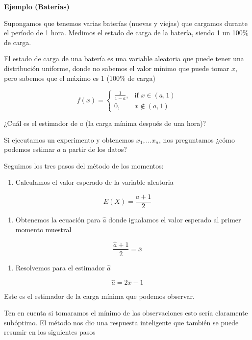 \documentclass[
]{book}
\providecommand{\tightlist}{%
  \setlength{\itemsep}{0pt}\setlength{\parskip}{0pt}}
\begin{document}
\textbf{Ejemplo (Baterías)}

Supongamos que tenemos varias baterías (nuevas y viejas) que cargamos durante el período de 1 hora. Medimos el estado de carga de la batería, siendo 1 un 100\% de carga.

El estado de carga de una batería es una variable aleatoria que puede tener una distribución uniforme, donde no sabemos el valor mínimo que puede tomar \(x\), pero sabemos que el máximo es 1 (\(100\%\) de carga)

\[
f(x)=
\begin{cases}
    \frac{1}{1-a},& \text{if } x\in (a,1)\\
    0,& x\notin (a,1)
\end{cases}
\]

¿Cuál es el estimador de \(a\) (la carga mínima después de una hora)?

Si ejecutamos un experimento y obtenemos \(x_1,...x_n\), nos preguntamos ¿cómo podemos estimar \(a\) a partir de los datos?

Seguimos los tres pasos del método de los momentos:

\begin{enumerate}
\def\labelenumi{\arabic{enumi}.}
\tightlist
\item
  Calculamos el valor esperado de la variable aleatoria
\end{enumerate}

\[E(X)=\frac{a+1}{2}\]

\begin{enumerate}
\def\labelenumi{\arabic{enumi}.}
\setcounter{enumi}{1}
\tightlist
\item
  Obtenemos la ecuación para \(\hat{a}\) donde igualamos el valor esperado al primer momento muestral
\end{enumerate}

\[\frac{\hat{a}+1}{2}=\bar{x}\]

\begin{enumerate}
\def\labelenumi{\arabic{enumi}.}
\setcounter{enumi}{2}
\tightlist
\item
  Resolvemos para el estimador \(\hat{a}\)
\end{enumerate}

\[\hat{a}=2\bar{x}-1\]

Este es el estimador de la carga mínima que podemos observar.

Ten en cuenta si tomaramos el mínimo de las observaciones esto sería claramente subóptimo. El método nos dio una respuesta inteligente que también se puede resumir en los siguientes pasos
\end{document}
